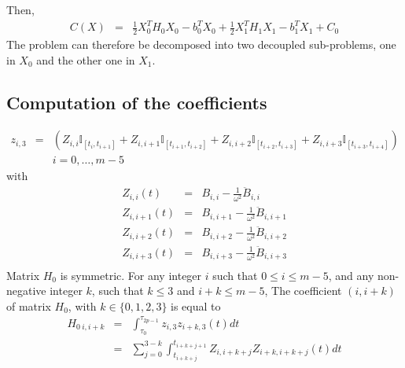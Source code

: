 \documentclass {article}
\newcommand\z{z}
\begin{document}
Then,
\begin{eqnarray*}
C(X) &=& \frac{1}{2}X_0^TH_0X_0 - b_0^T X_0 + \frac{1}{2}X_1^TH_1X_1 - b_1^T X_1 + C_0
\end{eqnarray*}
The problem can therefore be decomposed into two decoupled sub-problems, one in $X_0$ and the other one in $X_1$.

\subsection {Computation of the coefficients}

\begin{eqnarray*}
z_{i,3} &=& (Z_{i, i} \mathbb{I}_{[t_i, t_{i+1}]} + Z_{i,i+1} \mathbb{I}_{[t_{i+1}, t_{i+2}]} +Z_{i,i+2} \mathbb{I}_{[t_{i+2}, t_{i+3}]}+Z_{i,i+3} \mathbb{I}_{[t_{i+3}, t_{i+4}]})\\
&&i=0,\ldots, m-5
\end{eqnarray*}
with
\begin{eqnarray*}
Z_{i, i} (t) &=& B_{i,i} - \frac{1}{\omega^2} \ddot{B}_{i,i} \\
Z_{i,i+1} (t) &=& B_{i,i+1} - \frac{1}{\omega^2} \ddot{B}_{i,i+1} \\
Z_{i,i+2} (t) &=& B_{i,i+2} - \frac{1}{\omega^2} \ddot{B}_{i,i+2} \\
Z_{i,i+3} (t) &=& B_{i,i+3} - \frac{1}{\omega^2} \ddot{B}_{i,i+3} \\
\end{eqnarray*}
Matrix $H_0$ is symmetric. For any integer $i$ such that $0\leq i \leq m-5$, and any non-negative integer $k$, such that $k \leq 3$ and $i+k \leq m-5$,
The coefficient $(i,i+k)$ of matrix $H_0$, with $k\in\{0,1,2,3\}$ is equal to
\begin{eqnarray*}
H_{0\ i,i+k} &=& \int_{\tau_0}^{\tau_{2p-1}} \z_{i,3} \z_{i+k,3}(t)dt\\
&=& \sum_{j=0}^{3-k} \int_{t_{i+k+j}}^{t_{i+k+j+1}}Z_{i,i+k+j} Z_{i+k,i+k+j} (t) dt
\end{eqnarray*}
\end{document}
